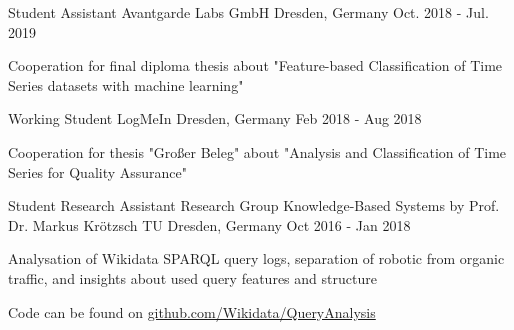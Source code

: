 \begin{cventries}
	\cventry
	{Student Assistant}
	{Avantgarde Labs GmbH}
	{Dresden, Germany}
	{Oct. 2018 - Jul. 2019}
	{
		\begin{cvitems}
			\item{Cooperation for final diploma thesis about "Feature-based Classification of Time Series datasets with machine learning"}
		\end{cvitems}
	}
	\cventry
	{Working Student} %
	{LogMeIn} %
	{Dresden, Germany} %
	{Feb 2018 - Aug 2018} %
	{
		\begin{cvitems} %
			\item {Cooperation for thesis "Großer Beleg" about "Analysis and Classification of Time Series for Quality Assurance"}
		\end{cvitems}
	}

	\cventry
	{Student Research Assistant} %
	{Research Group Knowledge-Based Systems by Prof. Dr. Markus Krötzsch} %
	{TU Dresden, Germany} %
	{Oct 2016 - Jan 2018} %
	{
		\begin{cvitems} %
			\item {Analysation of Wikidata SPARQL query logs, separation of robotic from organic traffic, and insights about used query features and structure}
			\item{Code can be found on \href{https://github.com/Wikidata/QueryAnalysis}{github.com/Wikidata/QueryAnalysis}}
		\end{cvitems}
	}


\end{cventries}
